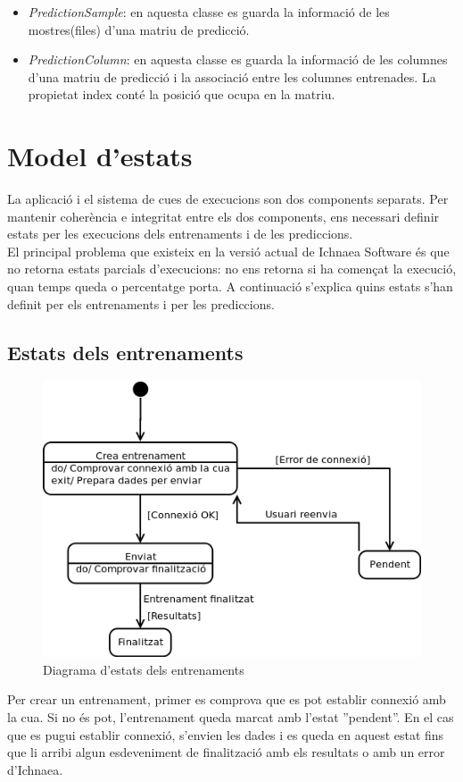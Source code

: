 \begin{itemize}
\item \textit{PredictionSample}: en aquesta classe es guarda la informaci\'{o} de les mostres(files) d'una matriu de predicci\'{o}.

\item \textit{PredictionColumn}: en aquesta classe es guarda la informaci\'{o} de les columnes d'una matriu de predicci\'{o} i la associaci\'{o} entre les columnes entrenades. La propietat index cont\'{e} la posició que ocupa en la matriu.
\end{itemize}

\section{Model d'estats}
\label{sec:status}
La aplicaci\'{o} i el sistema de cues de execucions son dos components separats. Per mantenir coherència e integritat entre els dos components, ens necessari definir estats per les execucions dels entrenaments i de les prediccions.\\

El principal problema que existeix en la versi\'{o} actual de Ichnaea Software \'{e}s que no retorna estats parcials d'execucions: no ens retorna si ha començat la execució, quan temps queda o percentatge porta. A continuaci\'{o} s'explica quins estats s'han definit per els entrenaments i per les prediccions.

\subsection{Estats dels entrenaments}
\begin{figure}[H]
  \centering
  \includegraphics[scale=0.4]{img/specification/StatesTraining.png}
  \caption{Diagrama d'estats dels entrenaments}
  \label{fig:statestraining}
\end{figure}
Per crear un entrenament, primer es comprova que es pot establir connexi\'{o} amb la cua. Si no \'{e}s pot, l'entrenament queda marcat amb l'estat ''pendent''. En el cas que es pugui establir connexi\'{o}, s'envien les dades i es queda en aquest estat fins que li arribi algun esdeveniment de finalitzaci\'{o} amb els resultats o amb un error d'Ichnaea.\\

